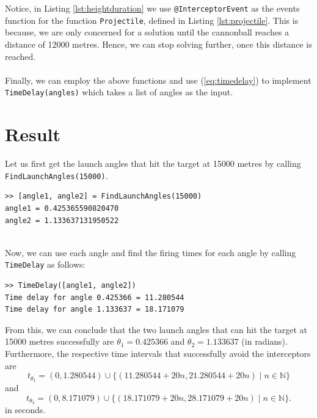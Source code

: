 \documentclass[11pt]{report}
\begin{document}


Notice, in Listing \ref{lst:heightduration} we use \texttt{@InterceptorEvent} as the events function for the function \texttt{Projectile}, defined in Listing \ref{lst:projectile}. This is because, we are only concerned for a solution until the cannonball reaches a distance of 12000 metres. Hence, we can stop solving further, once this distance is reached.\\


\ \\
Finally, we can employ the above functions and use (\ref{eq:timedelay}) to implement \texttt{TimeDelay(angles)} which takes a list of angles as the input. \\



\section{Result}
Let us first get the launch angles that hit the target at 15000 metres by calling \texttt{FindLaunchAngles(15000)}.

\begin{lstlisting}[title={Firing Angles (in radians) to hit target at 15000m.}]
>> [angle1, angle2] = FindLaunchAngles(15000)
angle1 = 0.425365590820470
angle2 = 1.133637131950522
\end{lstlisting}

\ \\
Now, we can use each angle and find the firing times for each angle by calling \texttt{TimeDelay} as follows:

\begin{lstlisting}[title={Time delays for both firing angles.}]
>> TimeDelay([angle1, angle2])
Time delay for angle 0.425366 = 11.280544
Time delay for angle 1.133637 = 18.171079
\end{lstlisting}

From this, we can conclude that the two launch angles that can hit the target at 15000 metres successfully are $\theta_1 = 0.425366$ and $\theta_2 = 1.133637$ (in radians). Furthermore, the respective time intervals that successfully avoid the interceptors are
 $$t_{\theta_1} = (0, 1.280544) \cup \{(11.280544 + 20n, 21.280544 + 20n) \mid n \in \mathbb{N}\}$$ 
 and
 $$t_{\theta_2} = (0, 8.171079) \cup  \{(18.171079 + 20n, 28.171079 + 20n) \mid n \in \mathbb{N}\}.$$
 in seconds.
\end{document}
